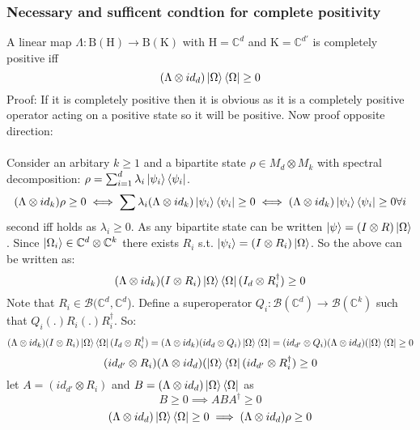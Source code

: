 \documentclass{article}
\begin{document}
\subsubsection{Necessary and sufficent condtion for complete positivity}
A linear map $\Lambda: \mathrm{B}(\mathrm{H}) \rightarrow \mathrm{B}(\mathrm{K})$ with $\mathrm{H} = \mathbb{C}^d$ and  $\mathrm{K} = \mathbb{C}^{d'}$  is completely positive iff
$$
(\Lambda \otimes id_d)\ket{\Omega}\bra{\Omega} \geq 0
$$
Proof:
If it is completely positive then it is obvious as it is a completely positive operator acting on a positive state so it will be positive. Now proof opposite direction:\\\\
Consider an arbitary $k \geq 1$ and a bipartite state $\rho \in M_d \otimes M_k$ with spectral decomposition: $\rho = \sum_{i=1}^d \lambda_i \ket{\psi_i} \bra{\psi_i}$.
$$
(\Lambda \otimes id_k)\rho \geq 0 \iff \sum \lambda_i (\Lambda \otimes id_k)\ket{\psi_i}\bra{\psi_i} \geq 0 \iff (\Lambda \otimes id_k)\ket{\psi_i}\bra{\psi_i} \geq 0 \forall i
$$
second iff holds as $\lambda_i \geq 0$. As any bipartite state can be written $\ket{\psi} = (I \otimes R) \ket{\Omega}$. Since $\ket{\Omega_i} \in \mathbb{C}^d \otimes \mathbb{C}^k$ there exists $R_i$ s.t. $\ket{\psi_i} = (I \otimes R_i) \ket{\Omega}$. So the above can be written as:
$$
(\Lambda \otimes id_k)(I \otimes R_i) \ket{\Omega} \bra{\Omega} (I_d \otimes R^{\dagger}_i) \geq 0
$$
Note that $R_i \in \mathcal{B}(\mathbb{C}^d, \mathbb{C}^d$). Define a superoperator $Q_i: \mathcal{B}(\mathbb{C}^d) \rightarrow \mathcal{B}(\mathbb{C}^k)$ such that $Q_i(.) R_i(.)R_i^{\dagger}$. So:
$$
(\Lambda \otimes id_k)(I \otimes R_i) \ket{\Omega} \bra{\Omega} (I_d \otimes R^{\dagger}_i) = (\Lambda \otimes id_k)(id_d \otimes Q_i) \ket{\Omega} \bra{\Omega}= (id_{d'} \otimes Q_i) (\Lambda \otimes id_d)(\ket{\Omega} \bra{\Omega} \geq 0
$$
$$
(id_{d'} \otimes R_i) (\Lambda \otimes id_d)(\ket{\Omega} \bra{\Omega} (id_{d'} \otimes R^{\dagger}_i) \geq 0
$$
let $A= (id_{d'} \otimes R_i) $ and $B = (\Lambda \otimes id_d)\ket{\Omega} \bra{\Omega} $
as
$$
B \geq 0 \implies ABA^{\dagger} \geq 0$$
$$(\Lambda \otimes id_d)\ket{\Omega} \bra{\Omega} \geq 0 \implies (\Lambda \otimes id_d)\rho \geq 0$$
\end{document}
